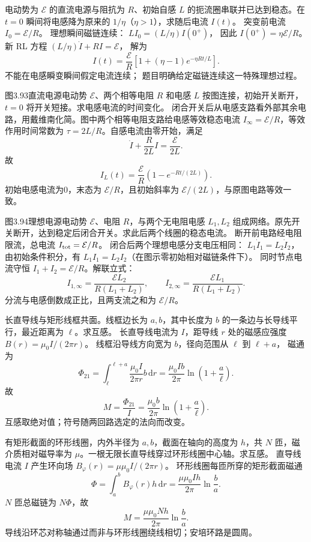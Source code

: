 电动势为 $\mathcal E$ 的直流电源与阻抗为 $R$、初始自感 $L$ 的扼流圈串联并已达到稳态。在 $t=0$ 瞬间将电感降为原来的 $1/\eta$（$\eta>1$），求随后电流 $I(t)$。
\exsolution
突变前电流 $I_0=\mathcal E/R$。
理想瞬间磁链连续：
$LI_0=(L/\eta)I(0^+)$，
因此 $I(0^+)=\eta\mathcal E/R$。
新 RL 方程
$(L/\eta)\dot I+RI=\mathcal E$，
解为
\[
\boxed{I(t)=\frac{\mathcal E}{R}
\left[1+(\eta-1)e^{-\eta Rt/L}\right]}.
\]
\excheck 不能在电感瞬变瞬间假定电流连续；
题目明确给定磁链连续这一特殊理想过程。

图3.93直流电源电动势 $\mathcal E$、两个相等电阻 $R$ 和电感 $L$ 按图连接，初始开关断开，$t=0$ 将开关短接。求电感电流的时间变化。
\exsolution
闭合开关后从电感支路看外部其余电路，用戴维南化简。图中两个相等电阻支路给电感等效稳态电流
$I_\infty=\mathcal E/R$，等效作用时间常数为 $\tau=2L/R$。自感电流由零开始，满足
\[
\dot I+\frac{R}{2L}I=\frac{\mathcal E}{2L}.
\]
故
\[
\boxed{I_L(t)=\frac{\mathcal E}{R}
\left(1-e^{-Rt/(2L)}\right)}.
\]
\excheck 初始电感电流为0，末态为 $\mathcal E/R$，且初始斜率为 $\mathcal E/(2L)$，与原图电路等效一致。

图3.94理想电源电动势 $\mathcal E$、电阻 $R$，与两个无电阻电感 $L_1,L_2$ 组成网络。原先开关断开，达到稳定后闭合开关。求此后两个线圈的稳态电流。
\exsolution
断开前电路经电阻限流，总电流
$I_{\rm tot}=\mathcal E/R$。
闭合后两个理想电感分支电压相同：
$L_1\dot I_1=L_2\dot I_2$，
由初始条件积分，有
$L_1I_1=L_2I_2$（在图示零初始相对磁链条件下）。
同时节点电流守恒
$I_1+I_2=\mathcal E/R$。解联立式：
\[
\boxed{I_{1,\infty}=
\frac{\mathcal E L_2}{R(L_1+L_2)},\qquad
I_{2,\infty}=
\frac{\mathcal E L_1}{R(L_1+L_2)}}.
\]
\excheck 分流与电感倒数成正比，且两支流之和为 $\mathcal E/R$。

长直导线与矩形线框共面。线框边长为 $a,b$，其中长度为 $b$ 的一条边与长导线平行，最近距离为 $\ell$。求互感。
\exsolution
长直导线电流为 $I$，距导线 $r$ 处的磁感应强度
$B(r)=\mu_0I/(2\pi r)$。
线框沿导线方向宽为 $b$，径向范围从 $\ell$ 到 $\ell+a$，
磁通为
\[
\Phi_{21}=\int_\ell^{\ell+a}
\frac{\mu_0I}{2\pi r}b\,\mathrm dr
=\frac{\mu_0Ib}{2\pi}
\ln\left(1+\frac a\ell\right).
\]
故
\[
\boxed{M=\frac{\Phi_{21}}I
=\frac{\mu_0b}{2\pi}\ln\left(1+\frac a\ell\right)}.
\]
\excheck 互感取绝对值；符号随两回路选定的法向而改变。

有矩形截面的环形线圈，内外半径为 $a,b$，截面在轴向的高度为 $h$，共 $N$ 匝，磁介质相对磁导率为 $\mu$。一根无限长直导线穿过环形线圈中心轴。求互感。
\exsolution
直导线电流 $I$ 产生环向场
$B_\varphi(r)=\mu\mu_0I/(2\pi r)$。
环形线圈每匝所穿的矩形截面磁通
\[
\Phi=\int_a^bB_\varphi(r)h\,\mathrm dr
=\frac{\mu\mu_0Ih}{2\pi}\ln\frac ba.
\]
$N$ 匝总磁链为 $N\Phi$，故
\[
\boxed{M=\frac{\mu\mu_0Nh}{2\pi}\ln\frac ba}.
\]
\excheck 导线沿环芯对称轴通过而非与环形线圈绕线相切；安培环路是圆周。


